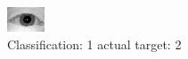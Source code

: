 \begin{figure}[h!]
\begin{center}
\includegraphics[width=0.60\columnwidth]{figures/ID991_class_1_target_2.png}
\end{center}
\caption{ Classification: 1 actual target: 2}
\label{fig:ID991_class_1_target_2}
\end{figure}
